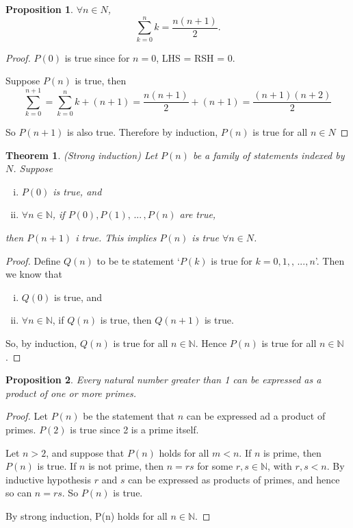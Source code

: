 \documentclass{article}
\newtheorem{proposition}{Proposition}
\newtheorem{theorem}{Theorem}
\begin{document}
\begin{proposition}
  \normalfont
  $\forall n \in N$, \[\sum_{k=0}^{n}k = \frac{n(n+1)}{2}.\]
\end{proposition}

\begin{proof}
  $P(0)$ is true since for $n = 0$, LHS = RSH = 0.

  Suppose $P(n)$ is true, then
  $$
  \sum^{n+1}_{k=0} = \sum^{n}_{k=0}k + (n + 1) = \frac{n(n+1)}{2} + (n+1) = \frac{(n+1)(n+2)}{2}
  $$

  So $P(n+1)$ is also true. Therefore by induction, $P(n)$ is true for all $n\in N$
\end{proof}

\begin{theorem}
  \normalfont
  (Strong induction) Let $P(n)$ be a family of statements indexed by $N$. Suppose
  \begin{enumerate}[i.]
    \item $P(0)$ is true, and 
    \item $\forall n\in \mathbb{N}$, if $P(0), P(1),\, ...\,, P(n)$ are true,
  \end{enumerate}
  then $P(n+1)$ i true. This implies $P(n)$ is true $\forall n\in N$.
\end{theorem}

\begin{proof}
  Define $Q(n)$ to be te statement `$P(k)$ is true for $k=0,1,,\, ..., n$'. Then we know that
  \begin{enumerate}[i.]
    \item $Q(0)$ is true, and
    \item $\forall n\in \mathbb{N}$, if $Q(n)$ is true, then $Q(n+1)$ is true.
  \end{enumerate}
  So, by induction, $Q(n)$ is true for all $n\in \mathbb{N}$. Hence $P(n)$ is true for all $n\in\mathbb{N}$.
\end{proof}

\begin{proposition}
  Every natural number greater than 1 can be expressed as a product of one or more primes.
\end{proposition}

\begin{proof}

  Let $P(n)$ be the statement that $n$ can be expressed ad a product of primes. $P(2)$ is true since 2 is a prime itself.

  Let $n>2$, and suppose that $P(n)$ holds for all $m<n$. If $n$ is prime, then $P(n)$ is true. If $n$ is not prime, then $n = rs$ for some $r,s \in\mathbb{N}$, with $r,s < n$. By inductive hypothesis $r$ and $s$ can be expressed as products of primes, and hence so can $n = rs$. So $P(n)$ is true.

  By strong induction, P(n) holds for all $n\in\mathbb{N}$.
\end{proof}
\end{document}
